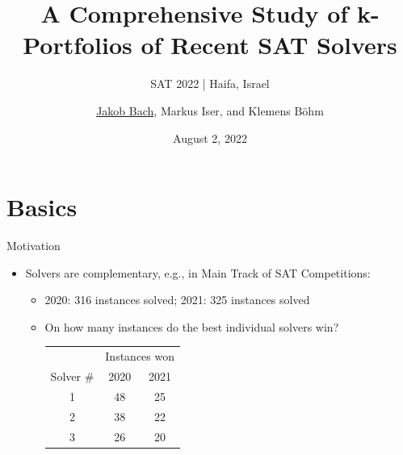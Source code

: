 \documentclass[en]{sdqbeamer}
\title[A Comprehensive Study of k-Portfolios of Recent SAT Solvers]{A Comprehensive Study of k-Portfolios of Recent SAT Solvers} %
\subtitle{SAT 2022 | Haifa, Israel}
\author[\underline{Jakob Bach}, Markus Iser, and Klemens Böhm]{\underline{Jakob Bach}, Markus Iser, and Klemens Böhm} %
\date[2022-08-02]{August 2, 2022} %
\begin{document}
\KITtitleframe

\section{Basics}

\begin{frame}[t]{Motivation}
	\begin{itemize}
		\pause
		\item Solvers are complementary, e.g., in Main Track of SAT Competitions:
		\begin{itemize}
			\item 2020: 316 instances solved; 2021: 325 instances solved
			\pause
			\item On how many instances do the best individual solvers win? \\
			\vspace{\baselineskip}
			\begin{tabular}{ccc}
				\toprule
				& \multicolumn{2}{c}{Instances won} \\
				\cmidrule{2-3}
				Solver \# & 2020 & 2021 \\
				\midrule
				1 & 48 & 25 \\
				2 & 38 & 22 \\
				3 & 26 & 20 \\
				\bottomrule
			\end{tabular}
		\end{itemize}

\end{itemize}
\end{frame}
\end{document}
